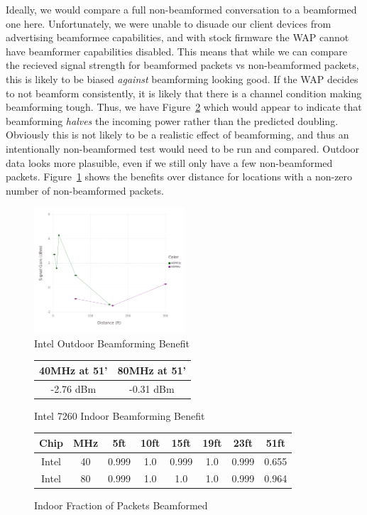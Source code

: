 Ideally, we would compare a full non-beamformed conversation to a
beamformed one here. Unfortunately, we were unable to disuade our
client devices from advertising beamformee capabilities, and with
stock firmware the WAP cannot have beamformer capabilities disabled.
This means that while we can compare the recieved signal strength for
beamformed packets vs non-beamformed packets, this is likely to be
biased \emph{against} beamforming looking good. If the WAP decides to
not beamform consistently, it is likely that there is a channel
condition making beamforming tough.   Thus, we have Figure~\ref{fig:intelindoorbeamresult}
which would appear to indicate that beamforming \emph{halves} the
incoming power rather than the predicted doubling. Obviously this is
not likely to be a realistic effect of beamforming, and thus an
intentionally non-beamformed test would need to be run and
compared. Outdoor data looks more plasuible, even if we still only
have a few non-beamformed
packets. Figure~\ref{fig:inteloutdoorbeambenefit} shows the benefits
over distance for locations with a non-zero number of non-beamformed
packets.
\begin{figure}[!h]
\centering
\includegraphics[width=0.5\textwidth]{figures/Intel_Outside_Beamforming_Benefit}
\caption{Intel Outdoor Beamforming Benefit}
\label{fig:inteloutdoorbeambenefit}
\end{figure}

\begin{figure}[h!]
\centering
\begin{tabular}{| c | c |}
\hline
40MHz at 51' & 80MHz at 51'\\ \hline
-2.76 dBm &  -0.31 dBm\\ \hline
\end{tabular}
\caption{Intel 7260 Indoor Beamforming Benefit}
\label{fig:intelindoorbeamresult}
\end{figure}

\begin{figure}[b!]
\centering
\begin{tabular}{| c | c || c | c | c | c | c | c |}
\hline
Chip & MHz & 5ft & 10ft & 15ft & 19ft & 23ft & 51ft\\ \hline
Intel & 40 & 0.999 & 1.0 & 0.999 & 1.0 & 0.999 & 0.655\\ \hline
Intel & 80 & 0.999 & 1.0 & 1.0 & 1.0 & 0.999 & 0.964\\ \hline
\end{tabular}
\caption{Indoor Fraction of Packets Beamformed}
\label{fig:indoorbeampercent}
\end{figure}


